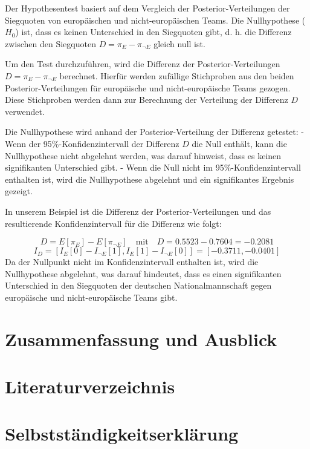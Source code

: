 \documentclass[a4paper,12pt]{article}
\begin{document}
Der Hypothesentest basiert auf dem Vergleich der Posterior-Verteilungen der Siegquoten von europäischen und nicht-europäischen Teams. Die Nullhypothese (\( H_0 \)) ist, dass es keinen Unterschied in den Siegquoten gibt, d. h. die Differenz zwischen den Siegquoten \( D = \pi_E - \pi_{\neg E} \) gleich null ist.

Um den Test durchzuführen, wird die Differenz der Posterior-Verteilungen \( D = \pi_E - \pi_{\neg E} \) berechnet. Hierfür werden zufällige Stichproben aus den beiden Posterior-Verteilungen für europäische und nicht-europäische Teams gezogen. Diese Stichproben werden dann zur Berechnung der Verteilung der Differenz \( D \) verwendet.

Die Nullhypothese wird anhand der Posterior-Verteilung der Differenz getestet:
- Wenn der 95\%-Konfidenzintervall der Differenz \( D \) die Null enthält, kann die Nullhypothese nicht abgelehnt werden, was darauf hinweist, dass es keinen signifikanten Unterschied gibt.
- Wenn die Null nicht im 95\%-Konfidenzintervall enthalten ist, wird die Nullhypothese abgelehnt und ein signifikantes Ergebnis gezeigt.

In unserem Beispiel ist die Differenz der Posterior-Verteilungen und das resultierende Konfidenzintervall für die Differenz wie folgt:

\[
D = E[\pi_E] - E[\pi_{\neg E}] \quad \text{mit} \quad D = 0.5523 - 0.7604 = -0.2081
\]
\[
I_D = [I_E[0] - I_{\neg E}[1], I_E[1] - I_{\neg E}[0]] = [-0.3711, -0.0401]
\]
Da der Nullpunkt nicht im Konfidenzintervall enthalten ist, wird die Nullhypothese abgelehnt, was darauf hindeutet, dass es einen signifikanten Unterschied in den Siegquoten der deutschen Nationalmannschaft gegen europäische und nicht-europäische Teams gibt.



\newpage

\section{Zusammenfassung und Ausblick}

\newpage

\section{Literaturverzeichnis} 

\printbibliography 
\newpage

\section{Selbstständigkeitserklärung}
\end{document}
